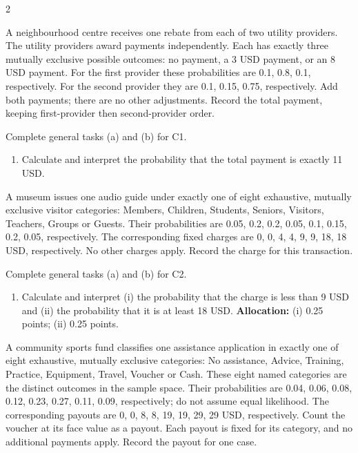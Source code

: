 \begin{multicols*}{2}
\noindent\begin{minipage}{\linewidth}
A neighbourhood centre receives one rebate from each of two utility providers. The utility providers award payments independently. Each has exactly three mutually exclusive possible outcomes: no payment, a 3 USD payment, or an 8 USD payment. For the first provider these probabilities are 0.1, 0.8, 0.1, respectively. For the second provider they are 0.1, 0.15, 0.75, respectively. Add both payments; there are no other adjustments. Record the total payment, keeping first-provider then second-provider order.

Complete general tasks (a)  and (b)  for C1.
\begin{enumerate}[label=(\alph*),start=3]
\item {} Calculate and interpret the probability that the total payment is exactly 11 USD.
\end{enumerate}
\end{minipage}\par\medskip

\noindent\begin{minipage}{\linewidth}
A museum issues one audio guide under exactly one of eight exhaustive, mutually exclusive visitor categories: Members, Children, Students, Seniors, Visitors, Teachers, Groups or Guests. Their probabilities are 0.05, 0.2, 0.2, 0.05, 0.1, 0.15, 0.2, 0.05, respectively. The corresponding fixed charges are 0, 0, 4, 4, 9, 9, 18, 18 USD, respectively. No other charges apply. Record the charge for this transaction.

Complete general tasks (a)  and (b)  for C2.
\begin{enumerate}[label=(\alph*),start=3]
\item {} Calculate and interpret (i) the probability that the charge is less than 9 USD and (ii) the probability that it is at least 18 USD.
\textbf{Allocation:} (i) 0.25 points; (ii) 0.25 points.
\end{enumerate}
\end{minipage}\par\medskip

\noindent\begin{minipage}{\linewidth}
A community sports fund classifies one assistance application in exactly one of eight exhaustive, mutually exclusive categories: No assistance, Advice, Training, Practice, Equipment, Travel, Voucher or Cash. These eight named categories are the distinct outcomes in the sample space. Their probabilities are 0.04, 0.06, 0.08, 0.12, 0.23, 0.27, 0.11, 0.09, respectively; do not assume equal likelihood. The corresponding payouts are 0, 0, 8, 8, 19, 19, 29, 29 USD, respectively. Count the voucher at its face value as a payout. Each payout is fixed for its category, and no additional payments apply. Record the payout for one case.


\end{minipage}
\end{multicols*}
